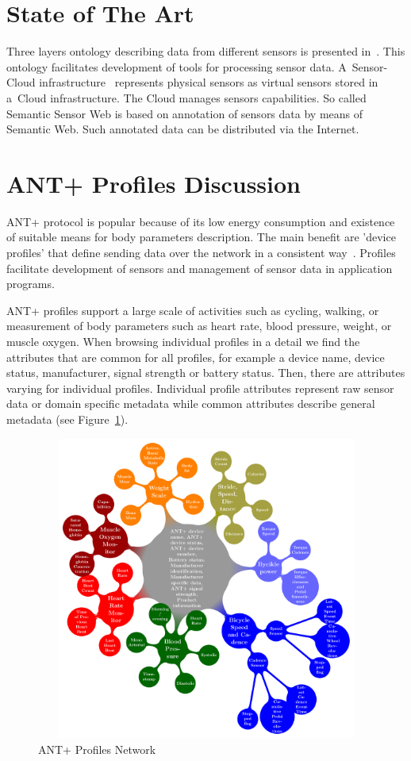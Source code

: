 \documentclass[conference]{IEEEtran}
\begin{document}
\section{State of The Art}\label{sec:state-of-the-art}

Three layers ontology describing data from different sensors is presented in~\cite{mehmood2014ontology}. This ontology facilitates development of tools for processing sensor data. A~Sensor-Cloud infrastructure~\cite{5635688} represents physical sensors as virtual sensors stored in a~Cloud infrastructure. The Cloud manages sensors capabilities. So called Semantic Sensor Web \cite{4557983} is based on annotation of sensors data by means of Semantic Web. Such annotated data can be distributed via the Internet.


\section{ANT+ Profiles Discussion}\label{sec:ant-plus-profiles}
ANT+ protocol is popular because of its low energy consumption and existence of suitable means for body parameters description. The main benefit are 'device profiles' that define sending data over the network in a consistent way~\cite{innovations2013ant}. Profiles facilitate development of sensors and management of sensor data in application programs.

ANT+ profiles support a large scale of activities such as cycling, walking, or measurement of body parameters such as heart rate, blood pressure, weight, or muscle oxygen. When browsing individual profiles in a detail we find the attributes that are common for all profiles, for example a device name, device status, manufacturer, signal strength or battery status. Then, there are attributes varying for individual profiles. Individual profile attributes represent raw sensor data or domain specific metadata while common attributes describe general metadata (see Figure~\ref{AntPlus}).


\begin{figure}
\centering\includegraphics[width=12cm, height=10cm]{AntPlusProfiles}
\caption{\label{AntPlus}ANT+ Profiles Network}
\end{figure}
\end{document}
